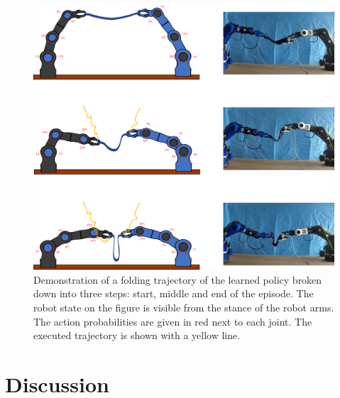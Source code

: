 \documentclass[\home/main.tex]{subfiles}
\begin{document}
\begin{figure}[htpb]
    \centering
    \includegraphics[width=\textwidth, keepaspectratio]{figures/robot_success_merge_with_pics.png}
    \caption{Demonstration of a folding trajectory of the learned policy broken down into three steps: start, middle and end of the episode. The robot state on the figure is visible from the stance of the robot arms. The action probabilities are given in red next to each joint. The executed trajectory is shown with a yellow line.  }
    \label{fig:robot_success_merge}
\end{figure}


\section{Discussion} \label{sec:instrumentation_discussion}
\end{document}
